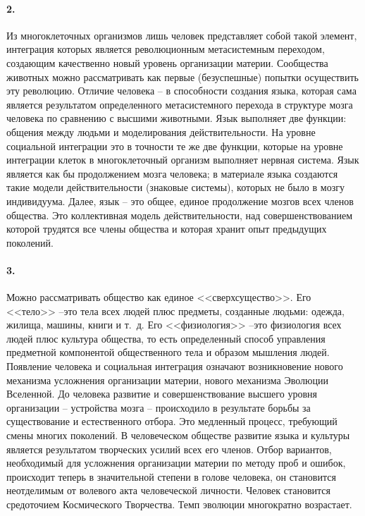 \documentclass{book}
\begin{document}
\paragraph{2.} Из многоклеточных организмов лишь человек представляет собой такой элемент, интеграция которых является революционным метасистемным переходом, создающим качественно новый уровень организации материи. Сообщества животных можно рассматривать как первые (безуспешные) попытки осуществить эту революцию. Отличие человека -- в способности создания языка, которая сама является результатом определенного метасистемного перехода в структуре мозга человека по сравнению с высшими животными. Язык выполняет две функции: общения между людьми и моделирования действительности. На уровне социальной интеграции это в точности те же две функции, которые на уровне интеграции клеток в многоклеточный организм выполняет нервная система. Язык является как бы продолжением мозга человека; в материале языка создаются такие модели действительности (знаковые системы), которых не было в мозгу индивидуума. Далее, язык -- это общее, единое продолжение мозгов всех членов общества. Это коллективная модель действительности, над 
совершенствованием которой трудятся все члены общества и которая хранит опыт предыдущих поколений.

\paragraph{3.} Можно рассматривать общество как единое <<сверхсущество>>. Его <<тело>> --это тела всех людей плюс предметы, созданные людьми: одежда, жилища, машины, книги и т.~д. Его <<физиология>> --это физиология всех людей плюс культура  общества, то есть определенный способ управления предметной компонентой общественного тела и образом мышления людей. Появление человека и социальная интеграция означают возникновение нового механизма усложнения организации материи, нового механизма Эволюции Вселенной. До человека развитие и совершенствование высшего уровня организации -- устройства мозга -- происходило в результате борьбы за существование и естественного отбора. Это медленный процесс, требующий смены многих поколений. В человеческом обществе развитие языка и культуры является результатом творческих усилий всех его членов. Отбор вариантов, необходимый для усложнения организации материи по методу проб и ошибок, происходит теперь в значительной степени в голове человека, он становится неотделимым от волевого 
акта человеческой личности. Человек становится средоточием Космического Творчества. Темп эволюции многократно возрастает.
\end{document}
